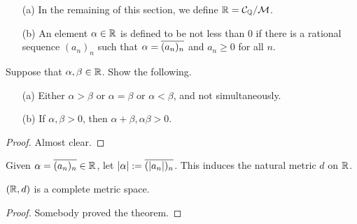 \begin{defi}
    \begin{enumerate}
        \item[(a)]
        {
            In the remaining of this section, we define ${\mathbb{R}}={\mathcal{C}}_{\mathbb{Q}}/{\mathcal{M}}$.
        }
        \item[(b)]
        {
            An element $\alpha\in{\mathbb{R}}$ is defined to be not less than 0 if there is a rational sequence $(a_n)_n$ such that $\alpha=\overline{(a_n)_n}$ and $a_n\geq 0$ for all $n$.
        }
    \end{enumerate}
\end{defi}
\begin{prop}
    Suppose that $\alpha, \beta\in{\mathbb{R}}$.
    Show the following.
    \begin{enumerate}
        \item[(a)]
        {
            Either $\alpha>\beta$ or $\alpha=\beta$ or $\alpha<\beta$, and not simultaneously.
        }
        \item[(b)]
        {
            If $\alpha, \beta>0$, then $\alpha+\beta, \alpha\beta>0$.
        }
    \end{enumerate}
\end{prop}
\begin{proof}
    Almost clear.
\end{proof}

Given $\alpha=\overline{(a_n)_n}\in{\mathbb{R}}$, let $|\alpha|:=\overline{(|a_n|)_n}$.
This induces the natural metric $d$ on ${\mathbb{R}}$.
\begin{thm}
    $({\mathbb{R}}, d)$ is a complete metric space.
\end{thm}
\begin{proof}
    Somebody proved the theorem.
\end{proof}